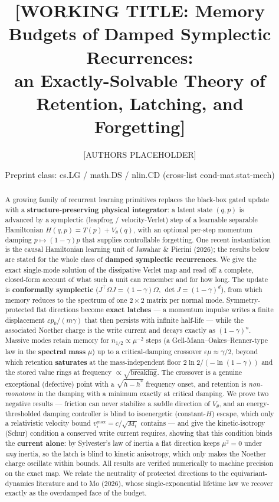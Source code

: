 \documentclass[11pt]{article}
\title{\textbf{[WORKING TITLE: Memory Budgets of Damped Symplectic Recurrences:\\
an Exactly-Solvable Theory of Retention, Latching, and Forgetting]}}
\author{[AUTHORS PLACEHOLDER]}
\date{Preprint class: cs.LG / math.DS / nlin.CD (cross-list cond-mat.stat-mech)}
\theoremstyle{plain}
\theoremstyle{definition}
\newcommand{\Om}{\Omega}
\begin{document}
\sloppy
\maketitle

\begin{abstract}
A growing family of recurrent learning primitives replaces the black-box gated update with a \textbf{structure-preserving physical integrator}: a latent state $(q,p)$ is advanced by a symplectic (leapfrog / velocity-Verlet) step of a learnable separable Hamiltonian $H(q,p)=T(p)+V_\theta(q)$, with an optional per-step momentum damping $p\mapsto(1-\gamma)p$ that supplies controllable forgetting. One recent instantiation is the causal Hamiltonian learning unit of Jawahar \& Pierini (2026); the results below are stated for the whole class of \textbf{damped symplectic recurrences}. We give the exact single-mode solution of the dissipative Verlet map and read off a complete, closed-form account of what such a unit can remember and for how long. The update is \textbf{conformally symplectic} ($J^\top\Om J=(1-\gamma)\Om$, $\det J=(1-\gamma)^d$), from which memory reduces to the spectrum of one $2\times2$ matrix per normal mode. Symmetry-protected flat directions become \textbf{exact latches} --- a momentum impulse writes a finite displacement $\varepsilon p_0/(m\gamma)$ that then persists with infinite half-life --- while the associated Noether charge is the write current and decays exactly as $(1-\gamma)^n$. Massive modes retain memory for $n_{1/2}\propto\mu^{-2}$ steps (a Gell-Mann--Oakes--Renner-type law in the \textbf{spectral mass} $\mu$) up to a critical-damping crossover $\varepsilon\mu\approx\gamma/2$, beyond which retention \textbf{saturates} at the mass-independent floor $2\ln2/(-\ln(1-\gamma))$ and the stored value rings at frequency $\propto\sqrt{\text{breaking}}$. The crossover is a genuine exceptional (defective) point with a $\sqrt{h-h^*}$ frequency onset, and retention is \emph{non-monotone} in the damping with a minimum exactly at critical damping. We prove two negative results --- friction can never stabilize a saddle direction of $V_\theta$, and an energy-thresholded damping controller is blind to isoenergetic (constant-$H$) escape, which only a relativistic velocity bound $v_i^{\max}=c/\sqrt{M_i}$ contains --- and give the kinetic-isotropy (Schur) condition a conserved write current requires, showing that this condition binds the \textbf{current alone}: by Sylvester's law of inertia a flat direction keeps $\mu^2=0$ under \emph{any} inertia, so the latch is blind to kinetic anisotropy, which only makes the Noether charge oscillate within bounds. All results are verified numerically to machine precision on the exact map. We relate the neutrality of protected directions to the equivariant-dynamics literature and to Mo (2026), whose single-exponential lifetime law we recover exactly as the overdamped face of the budget.
\end{abstract}
\end{document}
